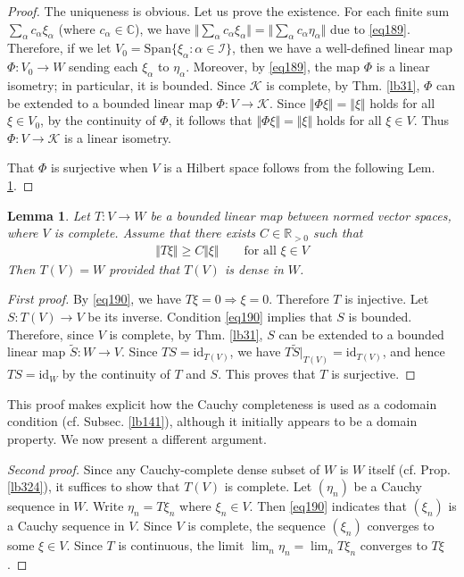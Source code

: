 \documentclass[12pt,b5paper,notitlepage]{article}
\theoremstyle{definition}
\theoremstyle{plain}
\newtheorem{lm}[df]{Lemma}
\newcommand{\wtd}{\widetilde}
\newcommand{\id}{\mathrm{id}}
\newcommand{\Span}{\mathrm{Span}}
\newcommand{\Cbb}{\mathbb C}
\newcommand{\Rbb}{\mathbb R}
\newcommand{\MK}{\mathcal K}
\newcommand{\SI}{\mathscr I}
\numberwithin{equation}{section}
\begin{document}
\begin{proof}
The uniqueness is obvious. Let us prove the existence. For each finite sum $\sum_\alpha c_\alpha\xi_\alpha$ (where $c_\alpha\in\Cbb$), we have $\Vert\sum_\alpha c_\alpha\xi_\alpha\Vert=\Vert\sum_\alpha c_\alpha\eta_\alpha\Vert$ due to \eqref{eq189}. Therefore, if we let $V_0=\Span\{\xi_\alpha:\alpha\in\SI\}$, then we have a well-defined linear map $\Phi:V_0\rightarrow W$ sending each $\xi_\alpha$ to $\eta_\alpha$. Moreover, by \eqref{eq189}, the map $\Phi$ is a linear isometry; in particular, it is bounded. Since $\MK$ is complete, by Thm. \ref{lb31}, $\Phi$ can be extended to a bounded linear map $\Phi:V\rightarrow\MK$. Since $\Vert\Phi\xi\Vert=\Vert\xi\Vert$ holds for all $\xi\in V_0$, by the continuity of $\Phi$, it follows that $\Vert\Phi\xi\Vert=\Vert\xi\Vert$ holds for all $\xi\in V$. Thus $\Phi:V\rightarrow\MK$ is a linear isometry.

That $\Phi$ is surjective when $V$ is a Hilbert space follows from the following Lem. \ref{lb367}.
\end{proof}


\begin{lm}\label{lb367}
Let $T:V\rightarrow W$ be a bounded linear map between normed vector spaces, where $V$ is complete. Assume that there exists $C\in\Rbb_{>0}$ such that
\begin{align}\label{eq190}
\Vert T\xi\Vert\geq C\Vert\xi\Vert\qquad\text{for all }\xi\in V
\end{align}
Then $T(V)=W$ provided that $T(V)$ is dense in $W$.
\end{lm}


\begin{proof}[First proof]
By \eqref{eq190}, we have $T\xi=0\Rightarrow\xi=0$. Therefore $T$ is injective. Let $S:T(V)\rightarrow V$ be its inverse. Condition \eqref{eq190} implies that $S$ is bounded. Therefore, since $V$ is complete, by Thm. \ref{lb31}, $S$ can be extended to a bounded linear map $\wtd S:W\rightarrow V$. Since $TS=\id_{T(V)}$, we have $T\wtd S|_{T(V)}=\id_{T(V)}$, and hence $TS=\id_W$ by the continuity of $T$ and $S$. This proves that $T$ is surjective.
\end{proof}

This proof makes explicit how the Cauchy completeness is used as a codomain condition (cf. Subsec. \ref{lb141}), although it initially appears to be a domain property. We now present a different argument.

\begin{proof}[Second proof]
Since any Cauchy-complete dense subset of $W$ is $W$ itself (cf. Prop. \ref{lb324}), it suffices to show that $T(V)$ is complete. Let $(\eta_n)$ be a Cauchy sequence in $W$. Write $\eta_n=T\xi_n$ where $\xi_n\in V$. Then \eqref{eq190} indicates that $(\xi_n)$ is a Cauchy sequence in $V$. Since $V$ is complete, the sequence $(\xi_n)$ converges to some $\xi\in V$. Since $T$ is continuous, the limit $\lim_n\eta_n=\lim_n T\xi_n$ converges to $T\xi$.
\end{proof}
\end{document}

